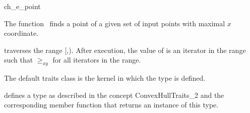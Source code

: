 

\begin{ccRefFunction}{ch_e_point}  %

\ccDefinition
  
The function \ccRefName\ finds a point of a given set  
of input points with maximal $x$ coordinate.


           {traverses the range [,).
            After execution, the value of
             is an iterator in the range such that  $\ge_{xy}$
             for all iterators  in the range. }

The default traits class  is the kernel in which the
type  is defined.

 defines a type  as described in 
the concept ConvexHullTraits\_2 and the corresponding member
function that returns an instance of this type.



\ccSeeAlso

 \\
 \\
 \\
 \\
 \\

\end{ccRefFunction}


